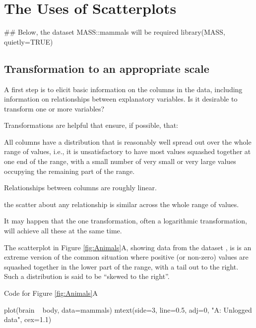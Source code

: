 \section{The Uses of Scatterplots}

\begin{Schunk}
\begin{Sinput}
## Below, the dataset MASS::mammals will be required
library(MASS, quietly=TRUE)
\end{Sinput}
\end{Schunk}

\subsection{Transformation to an appropriate scale}

A first step is to elicit basic information on the columns in the
data, including information on relationships between explanatory
variables.  Is it desirable to transform one or more variables?

Transformations are helpful that ensure, if possible, that:
\begin{itemizz}
\item All columns have a distribution that is reasonably well spread
  out over the whole range of values, i.e., it is unsatisfactory to
  have most values squashed together at one end of the range, with a
  small number of very small or very large values occupying the
  remaining part of the range.
  \item Relationships between columns are roughly linear.
  \item the scatter about any relationship is similar across the whole
range of values.
\end{itemizz}
It may happen that the one transformation, often a logarithmic
transformation, will achieve all these at the same time.

The scatterplot in Figure \ref{fig:Animals}A, showing data from the
dataset , is is an extreme version of the
common situation where positive (or non-zero) values are squashed
together in the lower part of the range, with a tail out to the right.
Such a distribution is said to be ``skewed to the right''.

Code for Figure \ref{fig:Animals}A
\begin{Schunk}
\begin{Sinput}
plot(brain ~ body, data=mammals)
mtext(side=3, line=0.5, adj=0,
      "A: Unlogged data", cex=1.1)
\end{Sinput}
\end{Schunk}

